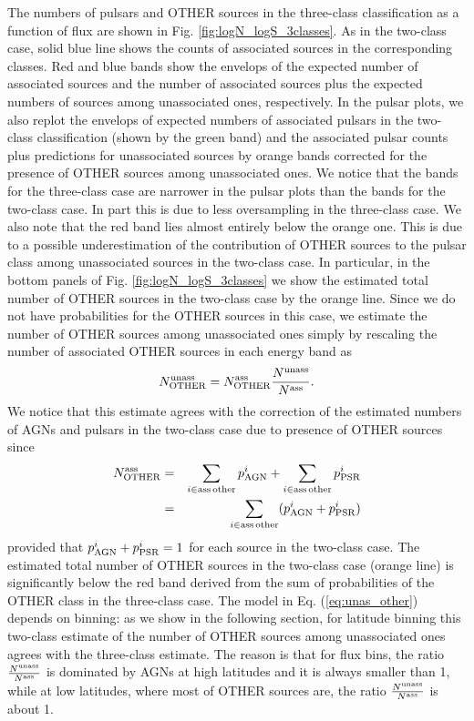 \documentclass[referee]{aa} %
\newcommand{\bea}{\begin{eqnarray}}
\newcommand{\eea}{\end{eqnarray}}
\newcommand{\lb}{\label}
\begin{document}
The numbers of pulsars and OTHER sources in the three-class classification as a function of flux are shown in Fig. \ref{fig:logN_logS_3classes}.
As in the two-class case, solid blue line shows the counts of associated sources in the corresponding classes.
Red and blue bands show the envelops of the expected number of associated sources and the number of associated sources plus the expected numbers of sources among unassociated ones, respectively.
In the pulsar plots, we also replot the envelops of expected numbers of associated pulsars in the two-class classification
(shown by the green band) and the associated pulsar counts plus predictions for unassociated sources by orange bands corrected for the presence of OTHER sources among unassociated ones.
We notice that the bands for the three-class case are narrower in the pulsar plots than the bands for the two-class case.
In part this is due to less oversampling in the three-class case. 
We also note that the red band lies almost entirely below the orange one.
This is due to a possible underestimation of the contribution of OTHER sources to the pulsar class among unassociated sources
in the two-class case.
In particular, in the bottom panels of Fig. \ref{fig:logN_logS_3classes} we show the estimated total number of OTHER sources in the two-class case by the orange line.
Since we do not have probabilities for the OTHER sources in this case, we estimate the number of OTHER sources among unassociated ones 
simply by rescaling the number of associated OTHER sources in each energy band as
\bea
\lb{eq:unas_other}
N_{\rm OTHER}^{\rm unass} = N_{\rm OTHER}^{\rm ass} \frac{N^{\rm unass}}{N^{\rm ass}}
.\eea
We notice that this estimate agrees with the correction of the estimated numbers of AGNs and pulsars in the two-class case due to presence of OTHER sources since
\bea
\nonumber
N_{\rm OTHER}^{\rm ass} &=& \sum_{i \in \rm ass\,other} p^i_{\rm AGN} + \sum_{i \in \rm ass\,other} p^i_{\rm PSR} \\
&=& \sum_{i \in \rm ass\,other} (p^i_{\rm AGN} + p^i_{\rm PSR})
\eea
provided that $p^i_{\rm AGN} + p^i_{\rm PSR} = 1$ for each source in the two-class case.
The estimated total number of OTHER sources in the two-class case (orange line) is significantly below the red band derived from the sum of probabilities of the OTHER class in the three-class case.
The model in Eq. (\ref{eq:unas_other}) depends on binning: as we show in the following section, for latitude binning this two-class
estimate of the number of OTHER sources among unassociated ones agrees with the three-class estimate.
The reason is that for flux bins, the ratio $\frac{N^{\rm unass}}{N^{\rm ass}}$ is dominated by AGNs at high latitudes and it is always smaller than 1, while at low latitudes, where most of OTHER sources are, the ratio $\frac{N^{\rm unass}}{N^{\rm ass}}$ is about 1.
\end{document}
